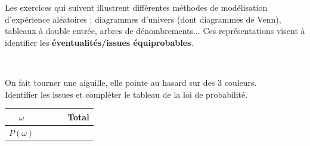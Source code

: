 \documentclass[main.tex]{subfiles}
\begin{document}
\begin{eBox}
	Les exercices qui suivent illustrent différentes méthodes de modélisation d'expérience aléatoires : diagrammes   d'univers (dont diagrammes de Venn), tableaux à double entrée, arbres de dénombrements... Ces représentations visent à identifier les \textbf{éventualités/issues équiprobables}.	
\end{eBox}
\begin{exercise} \hfill \\ 
\noindent
\parbox{0.70\linewidth}{
On fait tourner une aiguille, elle pointe au hasard sur des 3 couleurs.\\
 Identifier les issues et compléter le tableau de la loi de probabilité.\\
\renewcommand{\arraystretch}{1.5} 
\begin{tabularx}{1\linewidth}{|c|X|X|X|c|}
	\hline
	$\omega$ &  &  &   & \textbf{Total} \\\hline
	$P(\omega)$& &  &   &   \\ \hline
\end{tabularx} 
}
\hfill
\parbox{0.25\linewidth}{ \centering
{} 
}
\end{exercise} 
\end{document}
